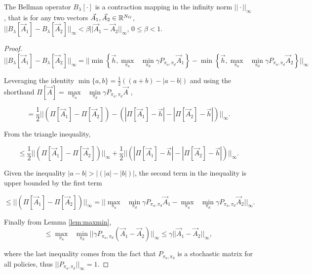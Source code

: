 \documentclass[letterpaper, 10 pt, conference]{ieeeconf}
\begin{document}
\begin{proposition} 
The Bellman operator $B_{\lambda}[\cdot]$ is a contraction mapping in the infinity norm $|| \cdot ||_{\infty}$, that is for any two vectors $\vec{A}_1, \vec{A}_2 \in \mathbb{R}^{N_G}$,  $||B_{\lambda}[\vec{A}_1] - B_{\lambda}[\vec{A}_2]||_{\infty} < \beta||\vec{A}_1 - \vec{A}_2||_{\infty}$, $0\leq \beta <1$.
\end{proposition}
\begin{proof}
\begin{equation*}
||B_{\lambda}[\vec{A}_1] - B_{\lambda}[\vec{A}_2]||_{\infty} = ||\min\left\{ \vec{h}, \underset{\pi_u}{\max}\text{ }\underset{ \pi_d}{\min} \gamma P_{\pi_u, \pi_d} \vec{A}_1 \right \}  - \min\left\{ \vec{h}, \underset{\pi_u}{\max}\text{ }\underset{ \pi_d}{\min} \gamma P_{\pi_u, \pi_d} \vec{A}_2 \right \}||_{\infty}
\end{equation*}

\noindent Leveraging the identity $\min\{a,b\} = \frac{1}{2}((a+b)- |a-b|)$ and using the shorthand $\Pi[\vec{A}]=\underset{\pi_u}{\max}\text{ }\underset{ \pi_d}{\min} \gamma P_{\pi_u, \pi_d} \vec{A}$ ,

\begin{equation*}
= \frac{1}{2} ||(\Pi[\vec{A}_1]  - \Pi[\vec{A}_2] ) -  (|\Pi[\vec{A}_1]-\vec{h}|  - |\Pi[\vec{A}_2]-\vec{h}|)||_{\infty}.
\end{equation*}

\noindent From the triangle inequality,

\begin{equation*}
\leq \frac{1}{2} ||(\Pi[\vec{A}_1]  - \Pi[\vec{A}_2] )||_{\infty} + \frac{1}{2}  ||(|\Pi[\vec{A}_1]-\vec{h}|  - |\Pi[\vec{A}_2]-\vec{h}|)||_{\infty}.
\end{equation*}

\noindent Given the inequality $|a-b| > |(|a|-|b|)|$, the second term in the inequality is upper bounded by the first term

\begin{equation*}
\leq ||(\Pi[\vec{A}_1]  - \Pi[\vec{A}_2] )||_{\infty}= ||\underset{\pi_u}{\max}\text{ }\underset{ \pi_d}{\min} \gamma P_{\pi_u, \pi_d}\vec{A}_1 - \underset{\pi_u}{\max}\text{ }\underset{ \pi_d}{\min} \gamma P_{\pi_u, \pi_d} \vec{A}_2||_{\infty}.
\end{equation*}

\noindent Finally from Lemma \ref{lem:maxmin},
\begin{equation*}
\leq \underset{\pi_u}{\max}\text{ }\underset{ \pi_d}{\min} ||\gamma P_{\pi_u, \pi_d} (\vec{A}_1 - \vec{A}_2)||_{\infty} \leq \gamma||\vec{A}_1 - \vec{A}_2||_{\infty},
\end{equation*}

\noindent where the last inequality comes from the fact that $P_{\pi_u, \pi_d}$ is a stochastic matrix for all policies, thus $||P_{\pi_u, \pi_d}||_{\infty} = 1$.
\end{proof}
\end{document}

